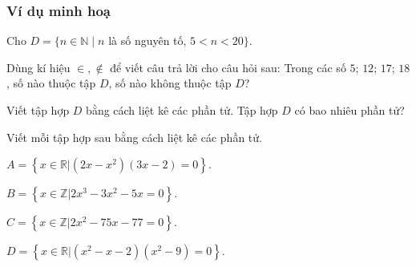 \subsubsection{Ví dụ minh hoạ}
\begin{vd}%
	Cho $D=\{n \in \mathbb{N} \mid n$ là số nguyên tố, $5<n<20\}$.
	\begin{enumEX}{1}
		\item Dùng kí hiệu $\in, \notin$ để viết câu trả lời cho câu hỏi sau: Trong các số $5$; $12$; $17$; $18$, số nào thuộc tập $D$, số nào không thuộc tập $D$?
		\item Viết tập hợp $D$ bằng cách liệt kê các phần tử. Tập hợp $D$ có bao nhiêu phần tử?
	\end{enumEX}
\end{vd}

\begin{vd}%
	Viết mỗi tập hợp sau bằng cách liệt kê các phần tử.
	\begin{enumEX}{2}
		\item $A=\left\{\left. x\in \mathbb{R}\right|\left(2x-x^2\right)\left(3x-2\right)=0\right\}$.
		\item $B=\left\{\left. x\in \mathbb{Z}\right|2x^3-3x^2-5x=0\right\}$.
		\item $C=\left\{\left. x\in \mathbb{Z}\right|2x^2-75x-77=0\right\}$.
		\item $D=\left\{\left. x\in \mathbb{R}\right|(x^2-x-2)(x^2-9)=0\right\}$.
	\end{enumEX}
\end{vd}

